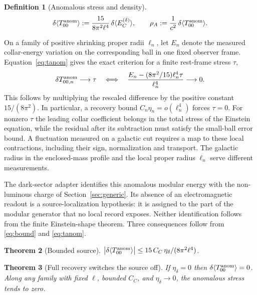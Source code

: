\documentclass[11pt]{article}
\newtheorem{theorem}{Theorem}[section]
\newtheorem{definition}[theorem]{Definition}
\begin{document}
\begin{definition}[Anomalous stress and density]
\begin{equation}
\delta\langle T_{00}^{\rm anom}\rangle
:=\frac{15}{8\pi^2\ell^4}\,\delta\langle E_C^{(\delta)}\rangle,
\qquad
\rho_A:=\frac{1}{c^2}\,\delta\langle T_{00}^{\rm anom}\rangle .
\label{eq:tanom}
\end{equation}
\end{definition}

On a family of positive shrinking proper radii $\ell_n$, let $E_n$
denote the measured collar-energy variation on the corresponding ball
in one fixed observer frame. Equation~\eqref{eq:tanom} gives the exact
criterion for a finite rest-frame stress $\tau$,
\[
  \delta T^{\rm anom}_{00,n}\longrightarrow\tau
  \quad\Longleftrightarrow\quad
  \frac{E_n-(8\pi^2/15)\ell_n^4\tau}{\ell_n^4}\longrightarrow0 .
\]
This follows by multiplying the rescaled difference by the positive
constant $15/(8\pi^2)$. In particular, a recovery bound
$C_n\eta_n=o(\ell_n^4)$ forces $\tau=0$. For nonzero $\tau$ the
leading collar coefficient belongs in the total stress of the Einstein
equation, while the residual after its subtraction must satisfy the
small-ball error bound. A fluctuation measured on a galactic cut
requires a map to these local contractions, including their sign,
normalization and transport. The galactic radius in the enclosed-mass
profile and the local proper radius $\ell_n$ serve different measurements.

The dark-sector adapter identifies this anomalous modular energy with the
non-luminous charge of Section~\ref{sec:generic}. Its absence of an
electromagnetic readout is a source-localization hypothesis: it is assigned to
the part of the modular generator that no local record exposes. Neither
identification follows from the finite Einstein-shape theorem. Three consequences follow from
\eqref{eq:bound} and \eqref{eq:tanom}.

\begin{theorem}[Bounded source]
\label{thm:bounded}
\(\bigl|\delta\langle T_{00}^{\rm anom}\rangle\bigr|
\le 15\,C_C\,\eta_\delta/(8\pi^2\ell^4)\).
\end{theorem}

\begin{theorem}[Full recovery switches the source off]
\label{thm:off}
If \(\eta_\delta=0\) then \(\delta\langle T_{00}^{\rm anom}\rangle=0\).
Along any family with fixed \(\ell\), bounded \(C_C\), and
\(\eta_\delta\to0\), the anomalous stress tends to zero.
\end{theorem}
\end{document}
